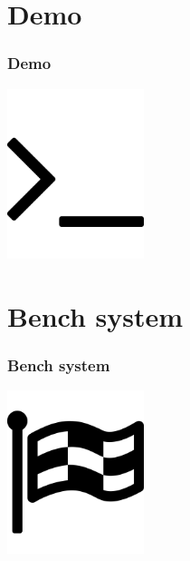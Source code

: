 \documentclass{beamer}
\begin{document}
  \section{Demo}
  \begin{frame}
    \frametitle{Demo}
    \begin{center}
      \includegraphics[width=4cm]{images/demo}
    \end{center}
  \end{frame}

  \section{Bench system}
  \begin{frame}
    \frametitle{Bench system}
    \begin{center}
      \includegraphics[width=4cm]{images/bench}
    \end{center}
  \end{frame}
\end{document}

